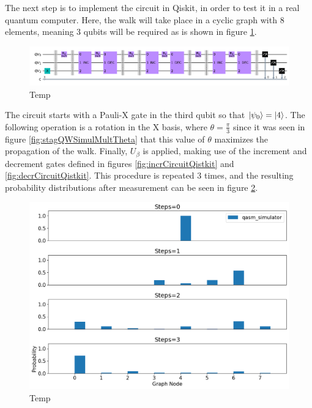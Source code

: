 \documentclass[../../dissertation.tex]{subfiles}
\begin{document}
The next step is to implement the circuit in Qiskit, in order to test it in a real quantum computer. Here, the walk will take place in a cyclic graph with $8$ elements, meaning 3 qubits will be required as is shown in figure \ref{fig:stagQWCircuitQistkit}.
\begin{figure}[!h]
	\centering
	\includegraphics[scale=0.32]{img/Qiskit/StaggeredQW/Circuits/circStagQW_N3_S3.png}
	\caption{Temp} 
	\label{fig:stagQWCircuitQistkit}
\end{figure}\par
The circuit starts with a Pauli-X gate in the third qubit so that $\ket{\psi_0}
= \ket{4}$. The following operation is a rotation in the X basis, where $\theta
= \frac{\pi}{3}$ since it was seen in figure \ref{fig:stagQWSimulMultTheta}
that this value of $\theta$ maximizes the propagation of the walk. Finally,
$U_\beta$ is applied, making use of the increment and decrement gates defined
in figures \ref{fig:incrCircuitQistkit} and \ref{fig:decrCircuitQistkit}. This
procedure is repeated $3$ times, and the resulting probability distributions
after measurement can be seen in figure \ref{fig:stagQWQiskitDist}. 
\begin{figure}[!h]
	\centering
	\includegraphics[scale=0.40]{img/Qiskit/StaggeredQW/StagQW_N3_S0123.png}
	\caption{Temp} 
	\label{fig:stagQWQiskitDist}
\end{figure}
\end{document}
